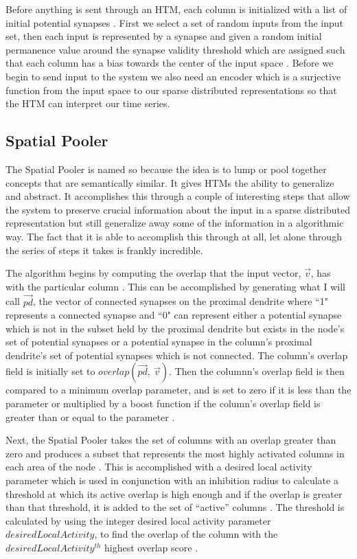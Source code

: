 \documentclass[fleqn,minimal]{article}
\begin{document}
	Before anything is sent through an HTM, each column is initialized with a list of initial potential synapses \cite{Whitepaper}. First we select a set of random inputs from the input set, then each input is represented by a synapse and given a random initial permanence value around the synapse validity threshold which are assigned such that each column has a bias towards the center of the input space \cite{Whitepaper}. Before we begin to send input to the system we also need an encoder which is a surjective function from the input space to our sparse distributed representations so that the HTM can interpret our time series.
	
	\subsection{Spatial Pooler}
	
	The Spatial Pooler is named so because the idea is to lump or pool together concepts that are semantically similar. It gives HTMs the ability to generalize and abstract. It accomplishes this through a couple of interesting steps that allow the system to preserve crucial information about the input in a sparse distributed representation but still generalize away some of the information in a algorithmic way. The fact that it is able to accomplish this through at all, let alone through the series of steps it takes is frankly incredible.
	
	The algorithm begins by computing the overlap that the input vector, $\overrightarrow{v}$, has with the particular column \cite{Whitepaper}. This can be accomplished by generating what I will call $\overrightarrow{pd}$, the vector of connected synapses on the proximal dendrite where ``1" represents a connected synapse and ``0" can represent either a potential synapse which is not in the subset held by the proximal dendrite but exists in the node's set of potential synapses or a potential synapse in the column's proximal dendrite's set of potential synapses which is not connected. The column's overlap field is initially set to $overlap(\overrightarrow{pd}, \ \overrightarrow{v})$. Then the columnn's overlap field is then compared to a minimum overlap parameter, and is set to zero if it is less than the parameter or multiplied by a boost function if the column's overlap field is greater than or equal to the parameter \cite{Whitepaper}.
	
	Next, the Spatial Pooler takes the set of columns with an overlap greater than zero and produces a subset that represents the most highly activated columns in each area of the node \cite{Principles}. This is accomplished with a desired local activity parameter which is used in conjunction with an inhibition radius to calculate a threshold at which its active overlap is high enough and if the overlap is greater than that threshold, it is added to the set of ``active'' columns \cite{Whitepaper}. The threshold is calculated by using the integer desired local activity parameter $desiredLocalActivity$, to find the overlap of the column with the $desiredLocalActivity^{th}$ highest overlap score \cite{Whitepaper}.
	
\end{document}
